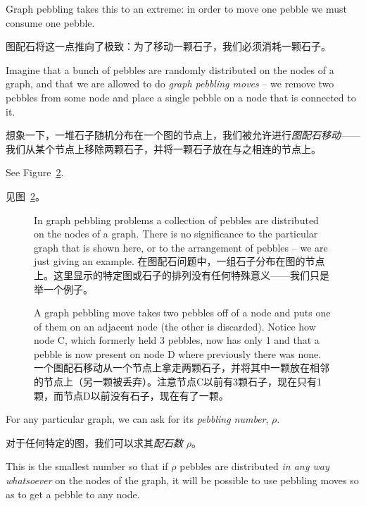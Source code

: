 Graph pebbling takes this to an extreme: in order to move one pebble
we must consume one pebble.

图配石将这一点推向了极致：为了移动一颗石子，我们必须消耗一颗石子。

Imagine that a bunch of pebbles are randomly
distributed on the nodes of a graph, and that we are allowed to do 
\emph{graph pebbling moves} -- we remove two pebbles from some node
and place a single pebble on a node that is connected to it.

想象一下，一堆石子随机分布在一个图的节点上，我们被允许进行\emph{图配石移动}——我们从某个节点上移除两颗石子，并将一颗石子放在与之相连的节点上。

See Figure~\ref{fig:pebbling_move}.

见图~\ref{fig:pebbling_move}。

\begin{figure}[!hbtp] 
\begin{center}

\end{center}
\caption[Graph pebbling.]{In graph pebbling problems a collection of pebbles
are distributed on the nodes of a graph.
There is no significance to the 
particular graph that is shown here, or to the arrangement of pebbles -- 
we are just giving an example. 在图配石问题中，一组石子分布在图的节点上。这里显示的特定图或石子的排列没有任何特殊意义——我们只是举一个例子。}
\label{fig:pebbling}
\end{figure}

\begin{figure}[!hbtp] 
\begin{center}

\end{center}
\caption[Graph pebbling move.]{A graph pebbling move takes two pebbles off
of a node and puts one of them on an adjacent node (the other is discarded).
Notice how node C, which formerly held 3 pebbles, now has only 1 and that 
a pebble is now present on node D where previously there was none. 一个图配石移动从一个节点上拿走两颗石子，并将其中一颗放在相邻的节点上（另一颗被丢弃）。注意节点C以前有3颗石子，现在只有1颗，而节点D以前没有石子，现在有了一颗。}
\label{fig:pebbling_move}
\end{figure}

For any particular graph, we can ask for its \emph{pebbling number}, $\rho$.

对于任何特定的图，我们可以求其\emph{配石数} $\rho$。

This is the smallest number so that if $\rho$ pebbles are distributed {\em in any way whatsoever} on the nodes of the graph, it will be possible to use 
pebbling moves so as to get a pebble to any node.

